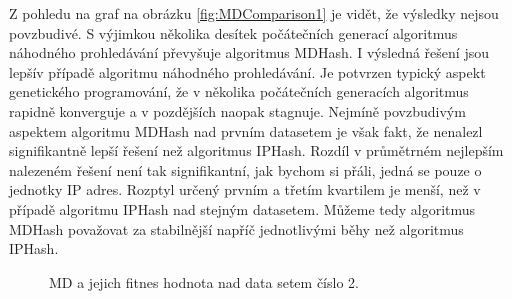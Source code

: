 Z pohledu na graf na obrázku \ref{fig:MDComparison1} je vidět, že výsledky nejsou povzbudivé. S výjimkou několika desítek počátečních
generací algoritmus náhodného prohledávání
převyšuje algoritmus MDHash. I výsledná řešení jsou lepšív případě algoritmu náhodného prohledávání. Je potvrzen typický aspekt genetického
programování, že v několika počátečních generacích algoritmus rapidně konverguje a v pozdějších naopak stagnuje. Nejmíně povzbudivým aspektem
algoritmu MDHash nad prvním datasetem je však fakt, že nenalezl signifikantně lepší řešení než algoritmus IPHash. Rozdíl v průmětrném nejlepším
nalezeném řešení není tak signifikantní, jak bychom si přáli, jedná se pouze o jednotky IP adres. Rozptyl určený prvním a třetím kvartilem je menší,
než v případě algoritmu IPHash nad stejným datasetem. Můžeme tedy algoritmus MDHash považovat za stabilnější napříč jednotlivými běhy než
algoritmus IPHash.

\begin{figure}[!ht]
	\centering
	\caption{MD a jejich fitnes hodnota nad data setem číslo 2.}
	\label{fig:MDComparison2}
\end{figure}

